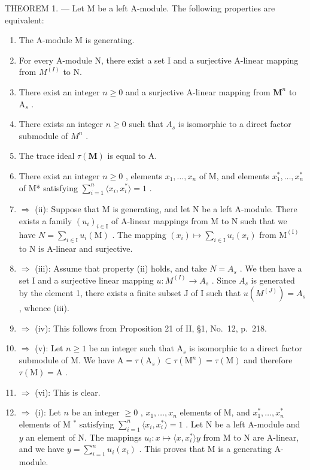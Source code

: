 THEOREM 1. --- Let M be a left A-module. The following properties are equivalent:

\begin{enumerate}
\def\labelenumi{(\roman{enumi})}
\item
  The A-module M is generating.
\item
  For every A-module N, there exist a set I and a surjective A-linear mapping from \(M^{(I)}\) to N.
\item
  There exist an integer \(n \geqslant 0\) and a surjective A-linear mapping from \(\mathbf{M}^n\) to \(\mathrm{A}_s\) .
\item
  There exists an integer \(n \geqslant 0\) such that \(A_s\) is isomorphic to a direct factor submodule of \(M^n\) .
\item
  The trace ideal \(\tau (\mathbf{M})\) is equal to A.
\item
  There exist an integer \(n \geqslant 0\) , elements \(x_{1}, \ldots, x_{n}\) of M, and elements \(x_{1}^{*}, \ldots, x_{n}^{*}\) of M* satisfying \(\sum_{i=1}^{n} \langle x_{i}, x_{i}^{*} \rangle = 1\) .
\item
  \(\Rightarrow\) (ii): Suppose that M is generating, and let N be a left A-module. There exists a family \((u_{i})_{i\in\mathrm{I}}\) of A-linear mappings from M to N such that we have \(N=\sum_{i\in\mathrm{I}}u_{i}(\mathrm{M})\) . The mapping \((x_{i})\mapsto\sum_{i\in\mathrm{I}}u_{i}(x_{i})\) from \(\mathrm{M}^{(\mathrm{I})}\) to N is A-linear and surjective.
\item
  \(\Rightarrow\) (iii): Assume that property (ii) holds, and take \(N = A_s\) . We then have a set I and a surjective linear mapping \(u: M^{(I)} \to A_s\) . Since \(A_s\) is generated by the element 1, there exists a finite subset J of I such that \(u(M^{(J)}) = A_s\) , whence (iii).
\item
  \(\Rightarrow\) (iv): This follows from Proposition 21 of II, §1, No.~12, p.~218.
\item
  \(\Rightarrow\) (v): Let \(n \geqslant 1\) be an integer such that \(\mathrm{A}_s\) is isomorphic to a direct factor submodule of M. We have \(\mathrm{A} = \tau(\mathrm{A}_s) \subset \tau(\mathrm{M}^n) = \tau(\mathrm{M})\) and therefore \(\tau(\mathrm{M}) = \mathrm{A}\) .
\item
  \(\Rightarrow\) (vi): This is clear.
\item
  \(\Rightarrow\) (i): Let \(n\) be an integer \(\geqslant 0\) , \(x_{1},\ldots ,x_{n}\) elements of M, and \(x_{1}^{*},\ldots ,x_{n}^{*}\) elements of M \(^*\) satisfying \(\sum_{i = 1}^{n}\langle x_i,x_i^*\rangle = 1\) . Let N be a left A-module and \(y\) an element of N. The mappings \(u_{i}:x\mapsto \langle x,x_{i}^{*}\rangle y\) from M to N are A-linear, and we have \(y = \sum_{i = 1}^{n}u_{i}(x_{i})\) . This proves that M is a generating A-module.
\end{enumerate}

